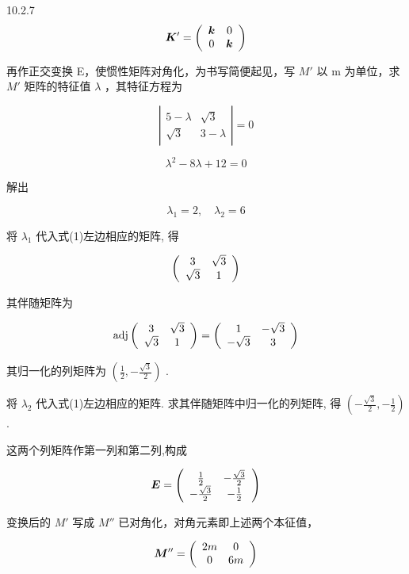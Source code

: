 \begin{problem}{10.2.7}
\[
\boldsymbol {K} ^ {\prime} = \left( \begin{array}{c c} \boldsymbol {k} & 0 \\ 0 & \boldsymbol {k} \end{array} \right)
\]

再作正交变换 E，使惯性矩阵对角化，为书写简便起见，写 $M'$ 以 m 为单位，求 $M'$ 矩阵的特征值 $\lambda$ ，其特征方程为

\[
\left| \begin{array}{cc} 5 - \lambda & \sqrt {3} \\ \sqrt {3} & 3 - \lambda \end{array} \right| = 0\tag{1}
\]

\[
\lambda^ {2} - 8 \lambda + 1 2 = 0
\]

解出

\[
\lambda_ {1} = 2, \quad \lambda_ {2} = 6
\]

将 $\lambda_{1}$ 代入式(1)左边相应的矩阵, 得

\[
\left( \begin{array}{c c} 3 & \sqrt {3} \\ \sqrt {3} & 1 \end{array} \right)
\]

其伴随矩阵为

\[
\operatorname{adj} \left( \begin{array}{c c} 3 & \sqrt {3} \\ \sqrt {3} & 1 \end{array} \right) = \left( \begin{array}{c c} 1 & - \sqrt {3} \\ - \sqrt {3} & 3 \end{array} \right)
\]

其归一化的列矩阵为 $\left(\frac{1}{2}, -\frac{\sqrt{3}}{2}\right)$ .

将 $\lambda_{2}$ 代入式(1)左边相应的矩阵. 求其伴随矩阵中归一化的列矩阵, 得 $\left(-\frac{\sqrt{3}}{2}, -\frac{1}{2}\right)$ .

这两个列矩阵作第一列和第二列,构成

\[
\boldsymbol {E} = \left( \begin{array}{c c} \frac {1}{2} & - \frac {\sqrt {3}}{2} \\ - \frac {\sqrt {3}}{2} & - \frac {1}{2} \end{array} \right)
\]

变换后的 $M'$ 写成 $M''$ 已对角化，对角元素即上述两个本征值，

\[
\boldsymbol {M} ^ {\prime \prime} = \left( \begin{array}{c c} 2 m & 0 \\ 0 & 6 m \end{array} \right)
\]


\end{problem}

